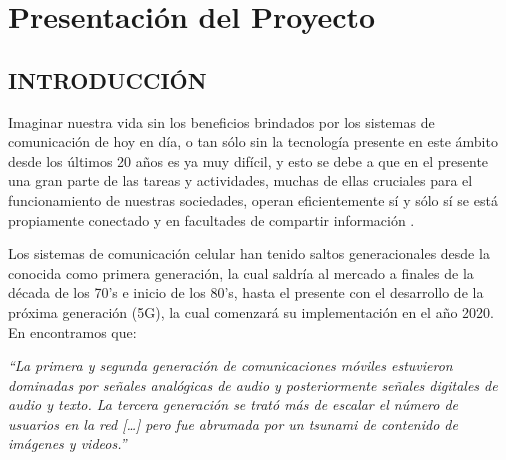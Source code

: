 
\chapter{Presentación del Proyecto} %

\label{Chapter1} %


\newcommand{\keyword}[1]{\textbf{#1}}
\newcommand{\tabhead}[1]{\textbf{#1}}
\newcommand{\code}[1]{\texttt{#1}}
\newcommand{\file}[1]{\texttt{\bfseries#1}}
\newcommand{\option}[1]{\texttt{\itshape#1}}


\section{INTRODUCCIÓN}

Imaginar nuestra vida sin los beneficios brindados por los sistemas de comunicación de hoy en día, o tan sólo sin la tecnología presente en este ámbito desde los últimos 20 años es ya muy difícil, y esto se debe a que en el presente una gran parte de las tareas y actividades, muchas de ellas cruciales para el funcionamiento de nuestras sociedades, operan eficientemente sí y sólo sí se está propiamente conectado y en facultades de compartir información \parencite{Fettweis2014}.\newline

Los sistemas de comunicación celular han tenido saltos generacionales desde la conocida como primera generación, la cual saldría al mercado a finales de la década de los 70’s e inicio de los 80’s, hasta el presente con el desarrollo de la próxima generación (5G), la cual comenzará su implementación en el año 2020. En \parencite{Fettweis2014} encontramos que:\newline

\textit{“La primera y segunda generación de comunicaciones móviles estuvieron dominadas por señales analógicas de audio y posteriormente señales digitales de audio y texto. La tercera generación se trató más de escalar el número de usuarios en la red […] pero fue abrumada por un tsunami de contenido de imágenes y videos.”}\newline

